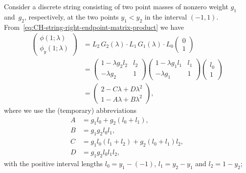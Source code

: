 \documentclass[10pt,a4paper]{article} \pdfoutput=1 
\begin{document}
\begin{example}
  \label{ex:CH-string-two-masses}
  Consider a discrete string consisting of
  two point masses of nonzero weight $g_1$ and~$g_2$, respectively,
  at the two points $y_1 < y_2$ in the interval $(-1,1)$.
  From~\eqref{eq:CH-string-right-endpoint-matrix-product} we have
  \begin{equation*}
    \begin{split}
      \begin{pmatrix} \phi(1;\lambda) \\ \phi_y(1;\lambda) \end{pmatrix}
      &
      = L_2 \, G_2(\lambda) \cdot L_1 \, G_1(\lambda) \cdot L_0
      \begin{pmatrix} 0 \\ 1 \end{pmatrix}
      \\ &
      =
      \begin{pmatrix} 1 - \lambda g_2 l_2 & l_2 \\ -\lambda g_2 & 1 \end{pmatrix}
      \begin{pmatrix} 1 - \lambda g_1 l_1 & l_1 \\ -\lambda g_1 & 1 \end{pmatrix}
      \begin{pmatrix} l_0 \\ 1 \end{pmatrix}
      \\ &
      =
      \begin{pmatrix}
        2 - C \lambda + D \lambda^2
        \\
        1 - A \lambda + B \lambda^2
      \end{pmatrix}
      ,
    \end{split}
  \end{equation*}
  where we use the (temporary) abbreviations
  \begin{equation}
    \begin{aligned}
      A &= g_1 l_0 + g_2 (l_0 + l_1)
      ,\\
      B &= g_1 g_2 l_0 l_1
      ,\\
      C &= g_1 l_0 (l_1 + l_2) + g_2 (l_0 + l_1) l_2
      ,\\
      D &= g_1 g_2 l_0 l_1 l_2
      ,
    \end{aligned}
  \end{equation}
  with the positive interval lengths
  $l_0 = y_1 - (-1)$, $l_1 = y_2 - y_1$ and $l_2 = 1 - y_2$;

\end{example}
\end{document}
